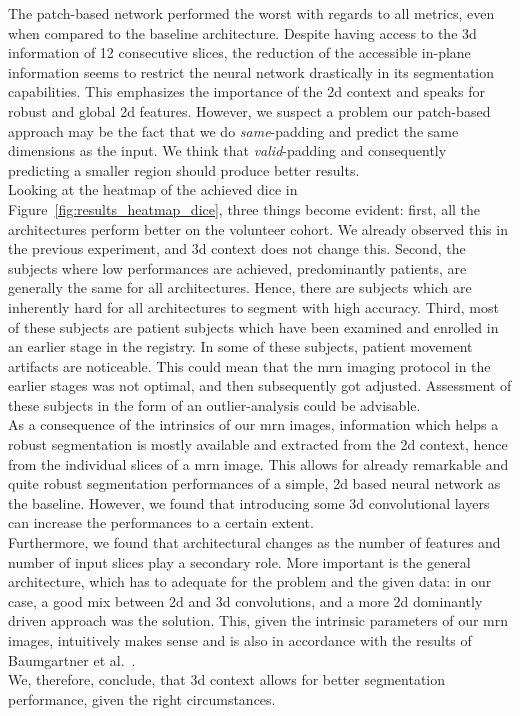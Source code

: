 The patch-based network performed the worst with regards to all metrics, even when compared to the baseline architecture. Despite having access to the \gls{3d} information of 12 consecutive slices, the reduction of the accessible in-plane information seems to restrict the neural network drastically in its segmentation capabilities. This emphasizes the importance of the \gls{2d} context and speaks for robust and global \gls{2d} features. However, we suspect a problem our patch-based approach may be the fact that we do \textit{same}-padding and predict the same dimensions as the input. We think that \textit{valid}-padding and consequently predicting a smaller region should produce better results.\\
Looking at the heatmap of the achieved \gls{dice} in Figure~\ref{fig:results_heatmap_dice}, three things become evident: first, all the architectures perform better on the volunteer cohort. We already observed this in the previous experiment, and \gls{3d} context does not change this. Second, the subjects where low performances are achieved, predominantly patients, are generally the same for all architectures. Hence, there are subjects which are inherently hard for all architectures to segment with high accuracy. Third, most of these subjects are patient subjects which have been examined and enrolled in an earlier stage in the registry. In some of these subjects, patient movement artifacts are noticeable. This could mean that the \gls{mrn} imaging protocol in the earlier stages was not optimal, and then subsequently got adjusted. Assessment of these subjects in the form of an outlier-analysis could be advisable.\\
As a consequence of the intrinsics of our \gls{mrn} images, information which helps a robust segmentation is mostly available and extracted from the \gls{2d} context, hence from the individual slices of a \gls{mrn} image. This allows for already remarkable and quite robust segmentation performances of a simple, \gls{2d} based neural network as the baseline. However, we found that introducing some \gls{3d} convolutional layers can increase the performances to a certain extent. \\
Furthermore, we found that architectural changes as the number of features and number of input slices play a secondary role. More important is the general architecture, which has to adequate for the problem and the given data: in our case, a good mix between \gls{2d} and \gls{3d} convolutions, and a more \gls{2d} dominantly driven approach was the solution. This, given the intrinsic parameters of our \gls{mrn} images, intuitively makes sense and is also in accordance with the results of Baumgartner et al.~\cite{Baumgartner2017AnSegmentation}.\\
We, therefore, conclude, that \gls{3d} context allows for better segmentation performance, given the right circumstances.

